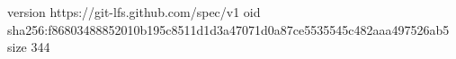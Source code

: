version https://git-lfs.github.com/spec/v1
oid sha256:f86803488852010b195c8511d1d3a47071d0a87ce5535545c482aaa497526ab5
size 344

